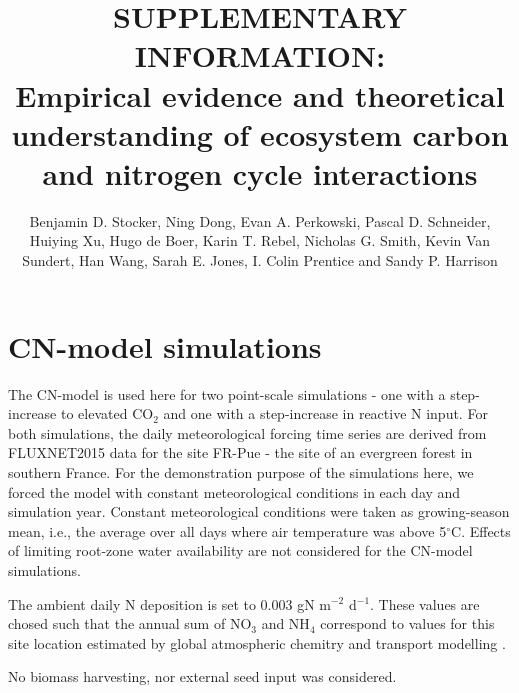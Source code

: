 \documentclass{myreport}
\begin{document}
\pagestyle{headings}

\renewcommand{\thefigure}{\arabic{figure}}
\renewcommand{\thetable}{\arabic{table}}
\renewcommand{\thesection}{Notes S\arabic{section}}
\renewcommand{\theequation}{\arabic{equation}}

\setcounter{section}{3}

% 

\title{SUPPLEMENTARY INFORMATION:\\
Empirical evidence and theoretical understanding of ecosystem carbon and nitrogen cycle interactions}
\author{Benjamin D. Stocker, Ning Dong, Evan A. Perkowski, Pascal D. Schneider,
Huiying Xu, Hugo de Boer, Karin T. Rebel, Nicholas G. Smith, Kevin Van Sundert, Han Wang, Sarah E. Jones, I. Colin Prentice and Sandy P. Harrison} 


\section{CN-model simulations}

The CN-model is used here for two point-scale simulations - one with a step-increase to elevated CO$_2$ and one with a step-increase in reactive N input. For both simulations, the daily meteorological forcing time series are derived from FLUXNET2015 data for the site FR-Pue \citep{rambal_growth_2004} - the site of an evergreen forest in southern France. For the demonstration purpose of the simulations here, we forced the model with constant meteorological conditions in each day and simulation year. Constant meteorological conditions were taken as growing-season mean, i.e., the average over all days where air temperature was above 5$^\circ$C. Effects of limiting root-zone water availability are not considered for the CN-model simulations. 

The ambient daily N deposition is set to 0.003 gN m$^{-2}$ d$^{-1}$. These values are chosed such that the annual sum of NO$_3$ and NH$_4$ correspond to values for this site location estimated by global atmospheric chemitry and transport modelling \citep{lamarque_global_2011}.

No biomass harvesting, nor external seed input was considered.
\end{document}
